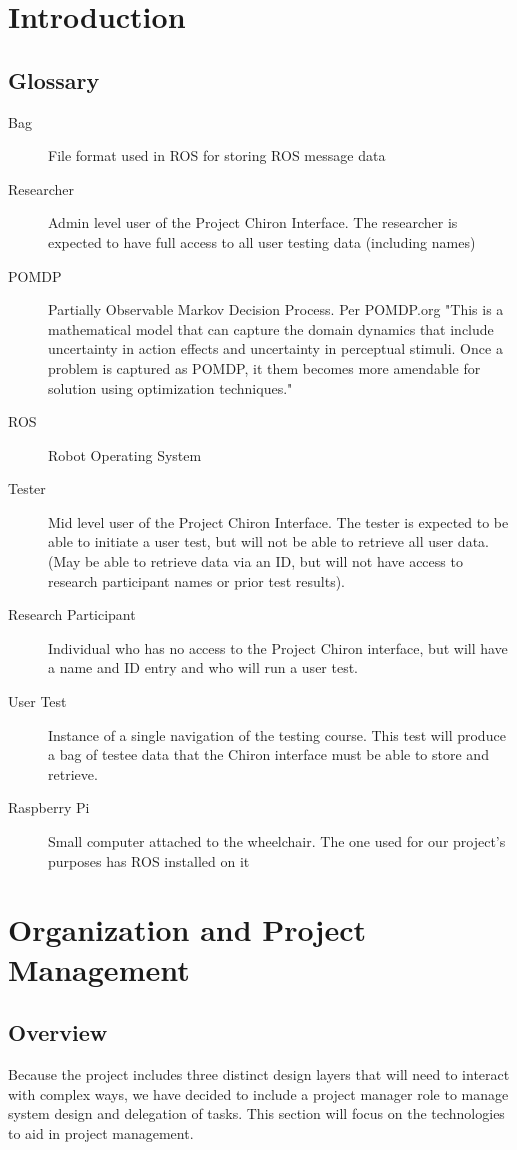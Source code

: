 \documentclass[onecolumn, draftclsnofoot,10pt, compsoc]{IEEEtran}
\begin{document}
\section{Introduction}


\subsection{Glossary}
\begin{description}
	\item [Bag] \hfill \break File format used in ROS for storing ROS message data
	\item [Researcher] \hfill \break Admin level user of the Project Chiron Interface. The researcher is expected to have full access to all user testing data (including names)
	\item [POMDP] \hfill \break Partially Observable Markov Decision Process. Per POMDP.org "This is a mathematical model that can capture the domain dynamics that include uncertainty in action effects and uncertainty in perceptual stimuli. Once a problem is captured as POMDP, it them becomes more amendable for solution using optimization techniques."  \cite{POMDP}
	\item [ROS] \hfill \break Robot Operating System
	\item [Tester] \hfil \break Mid level user of the Project Chiron Interface. The tester is expected to be able to initiate a user test, but will not be able to retrieve all user data. (May be able to retrieve data via an ID, but will not have access to research participant names or prior test results).
	\item [Research Participant] \hfill \break Individual who has no access to the Project Chiron interface, but will have a name and ID entry and who will run a user test.
	\item [User Test] \hfill \break Instance of a single navigation of the testing course. This test will produce a bag of testee data that the Chiron interface must be able to store and retrieve.
	\item [Raspberry Pi] \hfill \break Small computer attached to the wheelchair. The one used for our project's purposes has ROS installed on it
\end{description}
\section{Organization and Project Management}
\subsection{Overview}
Because the project includes three distinct design layers that will need to interact with complex ways, we have decided to include a project manager role to manage system design and delegation of tasks. This section will focus on the technologies to aid in project management.
\end{document}
